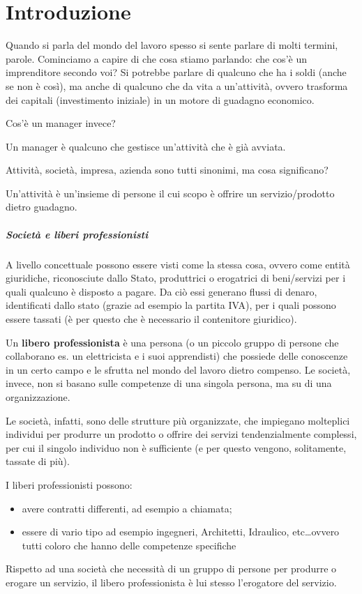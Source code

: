 \chapter{Introduzione}

Quando si parla del mondo del lavoro spesso si sente parlare di molti termini,
parole. Cominciamo a capire di che cosa stiamo parlando: che cos'è un
imprenditore secondo voi? Si potrebbe parlare di qualcuno che ha i soldi (anche
se non è così), ma anche di qualcuno che da vita a un'attività, ovvero
trasforma dei capitali (investimento iniziale) in un motore di guadagno
economico.

Cos'è un manager invece?
\begin{definition}[Manager]
Un manager è qualcuno che gestisce un'attività che è già avviata.
\end{definition}

Attività, società, impresa, azienda sono tutti sinonimi, ma cosa significano?
\begin{definition}[Attività]
Un'attività è un'insieme di persone il cui scopo è offrire un servizio/prodotto
dietro guadagno.
\end{definition}

\paragraph*{Società e liberi professionisti} A livello concettuale possono 
essere visti come la stessa cosa, ovvero come entità giuridiche, riconosciute 
dallo Stato, produttrici o erogatrici di beni/servizi per i quali qualcuno è 
disposto a pagare. Da ciò essi generano flussi di denaro, identificati dallo 
stato (grazie ad esempio la partita IVA), per i quali possono essere tassati (è 
per questo che è necessario il contenitore giuridico).

Un \textbf{libero professionista} è una persona (o un piccolo gruppo di persone 
che collaborano es. un elettricista e i suoi apprendisti) che possiede delle
conoscenze in un certo campo e le sfrutta nel mondo del lavoro dietro compenso.
Le società, invece, non si basano sulle competenze di una singola persona, ma su
di una organizzazione.

Le società, infatti, sono delle strutture più organizzate, che
impiegano molteplici individui per produrre un prodotto o offrire dei servizi
tendenzialmente complessi, per cui il singolo individuo non è
sufficiente (e per questo vengono, solitamente, tassate di più).

I liberi professionisti possono:
\begin{itemize}
  \item avere contratti differenti, ad esempio a chiamata;
  \item essere di vario tipo ad esempio ingegneri, Architetti, Idraulico,
  etc\dots ovvero tutti coloro che hanno delle competenze specifiche
\end{itemize}
Rispetto ad una società che necessità di un gruppo di persone per produrre o
erogare un servizio, il libero professionista è lui stesso l'erogatore del
servizio.

